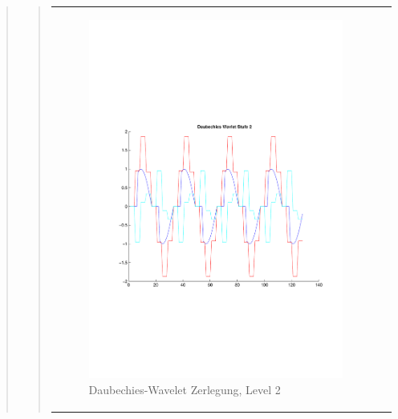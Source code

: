 \begin{quote}
\begin{quote}
\begin{center}
\begin{tabular}{ll}
\begin{minipage}{0.6\textwidth}
                    \end{minipage}
                    \begin{minipage}{0.6\textwidth}
    
                        \begin{figure}[H]
                            \label{fig:}
                            \includegraphics[scale=0.45, trim = 0.8cm 6cm 3cm
                            7.5cm,
                            clip]{./Bilder/Termin8/Daubechies_Wavlet_lvl_2}
                            \caption{Daubechies-Wavelet Zerlegung, Level 2}
                        \end{figure}
                    \vspace{-1.5em}
    
                    \end{minipage}
    

\end{tabular}
\end{center}
\end{quote}
\end{quote}

